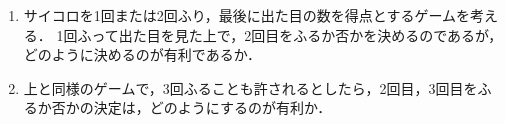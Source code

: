 \documentclass[../../main.tex]{subfiles}
\begin{document}
\begin{enumerate}
  \item サイコロを1回または2回ふり，最後に出た目の数を得点とするゲームを考える．
    1回ふって出た目を見た上で，2回目をふるか否かを決めるのであるが，どのように決めるのが有利であるか．
  \item 上と同様のゲームで，3回ふることも許されるとしたら，2回目，3回目をふるか否かの決定は，どのようにするのが有利か．
\end{enumerate}
\end{document}
